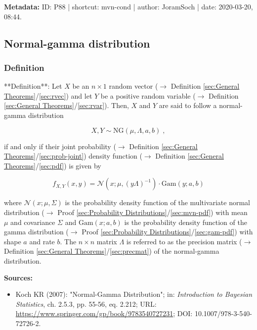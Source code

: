 \documentclass[a4paper,12pt,twoside]{book}
\begin{document}
\vspace{1em}
\textbf{Metadata:} ID: P88 | shortcut: mvn-cond | author: JoramSoch | date: 2020-03-20, 08:44.
\vspace{1em}



\subsection{Normal-gamma distribution}

\subsubsection[\textit{Definition}]{Definition} \label{sec:ng}
\setcounter{equation}{0}

**Definition**: Let $X$ be an $n \times 1$ random vector ($\rightarrow$ Definition \ref{sec:General Theorems}/\ref{sec:rvec}) and let $Y$ be a positive random variable ($\rightarrow$ Definition \ref{sec:General Theorems}/\ref{sec:rvar}). Then, $X$ and $Y$ are said to follow a normal-gamma distribution

\begin{equation} \label{eq:ng-ng}
X,Y \sim \mathrm{NG}(\mu, \Lambda, a, b) \; ,
\end{equation}

if and only if their joint probability ($\rightarrow$ Definition \ref{sec:General Theorems}/\ref{sec:prob-joint}) density function ($\rightarrow$ Definition \ref{sec:General Theorems}/\ref{sec:pdf}) is given by

\begin{equation} \label{eq:ng-ng-pdf}
f_{X,Y}(x,y) = \mathcal{N}(x; \mu, (y \Lambda)^{-1}) \cdot \mathrm{Gam}(y; a, b)
\end{equation}

where $\mathcal{N}(x; \mu, \Sigma)$ is the probability density function of the multivariate normal distribution ($\rightarrow$ Proof \ref{sec:Probability Distributions}/\ref{sec:mvn-pdf}) with mean $\mu$ and covariance $\Sigma$ and $\mathrm{Gam}(x; a, b)$ is the probability density function of the gamma distribution ($\rightarrow$ Proof \ref{sec:Probability Distributions}/\ref{sec:gam-pdf}) with shape $a$ and rate $b$. The $n \times n$ matrix $\Lambda$ is referred to as the precision matrix ($\rightarrow$ Definition \ref{sec:General Theorems}/\ref{sec:precmat}) of the normal-gamma distribution.


\vspace{1em}
\textbf{Sources:}
\begin{itemize}
\item Koch KR (2007): "Normal-Gamma Distribution"; in: \textit{Introduction to Bayesian Statistics}, ch. 2.5.3, pp. 55-56, eq. 2.212; URL: \url{https://www.springer.com/gp/book/9783540727231}; DOI: 10.1007/978-3-540-72726-2.
\end{itemize}
\end{document}
